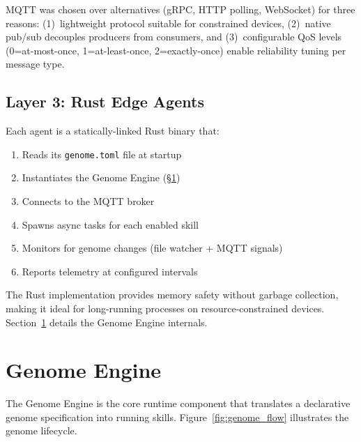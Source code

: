 \documentclass{article}
\newcommand{\genome}{\texttt{genome.toml}}
\begin{document}
MQTT was chosen over alternatives (gRPC, HTTP polling, WebSocket) for three reasons: (1)~lightweight protocol suitable for constrained devices, (2)~native pub/sub decouples producers from consumers, and (3)~configurable QoS levels (0=at-most-once, 1=at-least-once, 2=exactly-once) enable reliability tuning per message type.


\subsection{Layer 3: Rust Edge Agents}

Each agent is a statically-linked Rust binary that:
\begin{enumerate}[leftmargin=*]
    \item Reads its \genome{} file at startup
    \item Instantiates the Genome Engine (\S\ref{sec:genome_engine})
    \item Connects to the MQTT broker
    \item Spawns async tasks for each enabled skill
    \item Monitors for genome changes (file watcher + MQTT signals)
    \item Reports telemetry at configured intervals
\end{enumerate}

The Rust implementation provides memory safety without garbage collection, making it ideal for long-running processes on resource-constrained devices. Section~\ref{sec:genome_engine} details the Genome Engine internals.



\section{Genome Engine}
\label{sec:genome_engine}

The Genome Engine is the core runtime component that translates a declarative genome specification into running skills. Figure~\ref{fig:genome_flow} illustrates the genome lifecycle.
\end{document}
